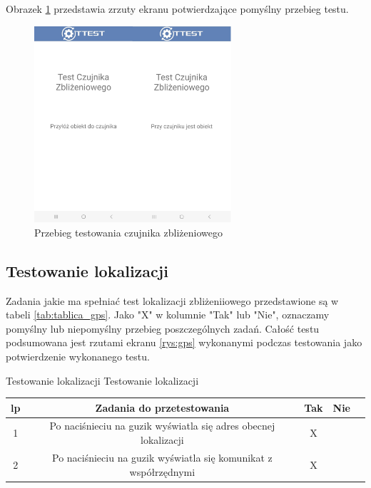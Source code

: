 Obrazek \ref{rys:zblizeniowy} przedstawia zrzuty ekranu potwierdzające pomyślny przebieg testu.

\begin{figure}[!hbt]
	\begin{center}
		\includegraphics[angle=360, width=0.65\textwidth]{rys/punkt5/zblizeniowy.jpg}
		\caption{Przebieg testowania czujnika zbliżeniowego}
		\label{rys:zblizeniowy}
	\end{center}
\end{figure}   

\newpage


\subsection{Testowanie lokalizacji}

Zadania jakie ma spełniać test lokalizacji zbliżeniiowego przedstawione są w tabeli \ref{tab:tablica_gps}. Jako "X" w kolumnie "Tak" lub "Nie", oznaczamy pomyślny lub niepomyślny przebieg poszczególnych zadań. Całość testu podsumowana jest rzutami ekranu \ref{rys:gps} wykonanymi podczas testowania jako potwierdzenie wykonanego testu.

\begin{tabela}
	{Testowanie lokalizacji}	%
	{Testowanie lokalizacji}	%
	{
		\begin{tabular}{|c|c|c|c|c|} \hline
			\textbf{lp} & \textbf{Zadania do przetestowania} & \textbf{Tak} & \textbf{Nie} \\ \hline
			1 & Po naciśnieciu na guzik wyświatla się adres obecnej lokalizacji  & X & ~ \\ \hline
			2 & Po naciśnieciu na guzik wyświatla się komunikat z współrzędnymi & X & ~ \\ \hline
	\end{tabular}	}
	\label{tab:tablica_gps}
\end{tabela}

